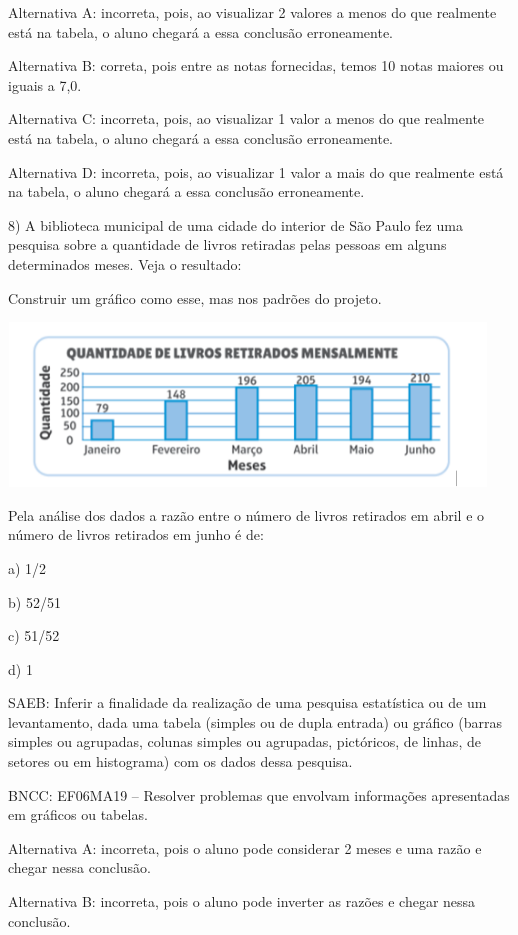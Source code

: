 Alternativa A: incorreta, pois, ao visualizar 2 valores a menos do que
realmente está na tabela, o aluno chegará a essa conclusão erroneamente.

Alternativa B: correta, pois entre as notas fornecidas, temos 10 notas
maiores ou iguais a 7,0.

Alternativa C: incorreta, pois, ao visualizar 1 valor a menos do que
realmente está na tabela, o aluno chegará a essa conclusão erroneamente.

Alternativa D: incorreta, pois, ao visualizar 1 valor a mais do que
realmente está na tabela, o aluno chegará a essa conclusão erroneamente.

8) A biblioteca municipal de uma cidade do interior de São Paulo fez uma
pesquisa sobre a quantidade de livros retiradas pelas pessoas em alguns
determinados meses. Veja o resultado:

Construir um gráfico como esse, mas nos padrões do projeto.

\includegraphics[width=5in,height=1.71875in]{./imgSAEB_6_MAT/media/image117.png}

Pela análise dos dados a razão entre o número de livros retirados em
abril e o número de livros retirados em junho é de:

a) 1/2

b) 52/51

c) 51/52

d) 1

SAEB: Inferir a finalidade da realização de uma pesquisa estatística ou
de um levantamento, dada uma tabela (simples ou de dupla entrada) ou
gráfico (barras simples ou agrupadas, colunas simples ou agrupadas,
pictóricos, de linhas, de setores ou em histograma) com os dados dessa
pesquisa.

BNCC: EF06MA19 -- Resolver problemas que envolvam informações
apresentadas em gráficos ou tabelas.~

Alternativa A: incorreta, pois o aluno pode considerar 2 meses e uma
razão e chegar nessa conclusão.

Alternativa B: incorreta, pois o aluno pode inverter as razões e chegar
nessa conclusão.

